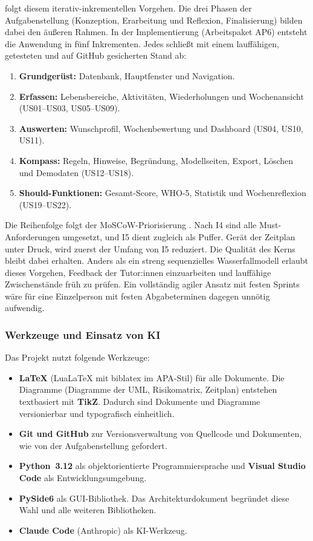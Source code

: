 \Projektname{} folgt diesem iterativ-inkrementellen Vorgehen. Die drei Phasen der Aufgabenstellung (Konzeption, Erarbeitung und Reflexion, Finalisierung) bilden dabei den äußeren Rahmen. In der Implementierung (Arbeitspaket AP6) entsteht die Anwendung in fünf Inkrementen. Jedes schließt mit einem lauffähigen, getesteten und auf GitHub gesicherten Stand ab:
\begin{enumerate}[label=I\arabic*]
  \item \textbf{Grundgerüst:} Datenbank, Hauptfenster und Navigation.
  \item \textbf{Erfassen:} Lebensbereiche, Aktivitäten, Wiederholungen und Wochenansicht (US01--US03, US05--US09).
  \item \textbf{Auswerten:} Wunschprofil, Wochenbewertung und Dashboard (US04, US10, US11).
  \item \textbf{Kompass:} Regeln, Hinweise, Begründung, Modellseiten, Export, Löschen und Demodaten (US12--US18).
  \item \textbf{Should-Funktionen:} Gesamt-Score, WHO-5, Statistik und Wochenreflexion (US19--US22).
\end{enumerate}
Die Reihenfolge folgt der \ac{MoSCoW}-Priorisierung \parencite[Kap.~10]{dsdm2014}. Nach I4 sind alle Must-Anforderungen umgesetzt, und I5 dient zugleich als Puffer. Gerät der Zeitplan unter Druck, wird zuerst der Umfang von I5 reduziert. Die Qualität des Kerns bleibt dabei erhalten. Anders als ein streng sequenzielles Wasserfallmodell erlaubt dieses Vorgehen, Feedback der Tutor:innen einzuarbeiten und lauffähige Zwischenstände früh zu prüfen. Ein vollständig agiler Ansatz mit festen Sprints wäre für eine Einzelperson mit festen Abgabeterminen dagegen unnötig aufwendig.

\subsubsection{Werkzeuge und Einsatz von KI}
Das Projekt nutzt folgende Werkzeuge:
\begin{itemize}
  \item \textbf{LaTeX} (LuaLaTeX mit biblatex im APA-Stil) für alle Dokumente. Die Diagramme (Diagramme der \ac{UML}, Risikomatrix, Zeitplan) entstehen textbasiert mit \textbf{TikZ}. Dadurch sind Dokumente und Diagramme versionierbar und typografisch einheitlich.
  \item \textbf{Git und GitHub} zur Versionsverwaltung von Quellcode und Dokumenten, wie von der Aufgabenstellung gefordert.
  \item \textbf{Python~3.12} als objektorientierte Programmiersprache und \textbf{Visual Studio Code} als Entwicklungsumgebung.
  \item \textbf{PySide6} \parencite{pyside6} als \ac{GUI}-Bibliothek. Das Architekturdokument begründet diese Wahl und alle weiteren Bibliotheken.
  \item \textbf{Claude Code} (Anthropic) als \ac{KI}-Werkzeug.
\end{itemize}


